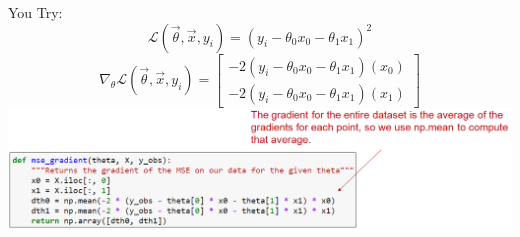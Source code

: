 \documentclass[aspectratio=169]{../latex_main/tntbeamer}  %
\begin{document}
	
	
	\begin{frame}[c]{You Try:}
	    \begin{equation*}
	        \mathcal{L}(\Vec{\theta}, \Vec{x}, y_i) = (y_i - \theta_0x_0 - \theta_1x_1)^2
	    \end{equation*}
	    \begin{equation*}
	        \nabla_\theta \mathcal{L}(\Vec{\theta}, \Vec{x}, y_i) = \left[\begin{array}{c}
	             -2(y_i - \theta_0x_0 - \theta_1x_1)(x_0) \\
                 -2(y_i - \theta_0x_0 - \theta_1x_1)(x_1)
	        \end{array}\right]
	    \end{equation*}
	    \includegraphics[scale=.4]{Bild28}
	\end{frame}
\end{document}
